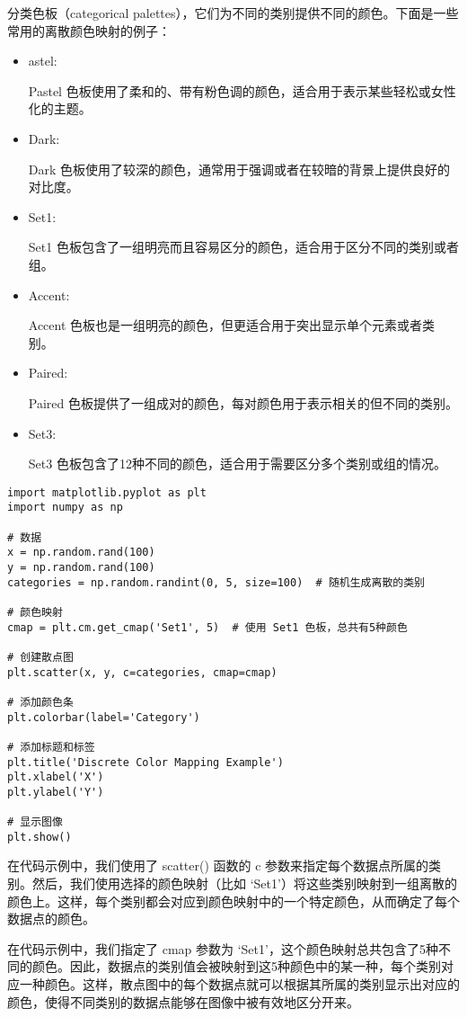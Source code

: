 \documentclass{article}
\begin{document}
分类色板（categorical palettes），它们为不同的类别提供不同的颜色。下面是一些常用的离散颜色映射的例子：
\begin{itemize}


    \item astel:

Pastel 色板使用了柔和的、带有粉色调的颜色，适合用于表示某些轻松或女性化的主题。
\item Dark:

Dark 色板使用了较深的颜色，通常用于强调或者在较暗的背景上提供良好的对比度。
\item  Set1:

Set1 色板包含了一组明亮而且容易区分的颜色，适合用于区分不同的类别或者组。
\item Accent:

Accent 色板也是一组明亮的颜色，但更适合用于突出显示单个元素或者类别。
\item Paired:

Paired 色板提供了一组成对的颜色，每对颜色用于表示相关的但不同的类别。
\item Set3:

Set3 色板包含了12种不同的颜色，适合用于需要区分多个类别或组的情况。
\end{itemize}
\begin{lstlisting}[caption={示例Python代码}]
import matplotlib.pyplot as plt
import numpy as np

# 数据
x = np.random.rand(100)
y = np.random.rand(100)
categories = np.random.randint(0, 5, size=100)  # 随机生成离散的类别

# 颜色映射
cmap = plt.cm.get_cmap('Set1', 5)  # 使用 Set1 色板，总共有5种颜色

# 创建散点图
plt.scatter(x, y, c=categories, cmap=cmap)

# 添加颜色条
plt.colorbar(label='Category')

# 添加标题和标签
plt.title('Discrete Color Mapping Example')
plt.xlabel('X')
plt.ylabel('Y')

# 显示图像
plt.show()
\end{lstlisting}
在代码示例中，我们使用了 scatter() 函数的 c 参数来指定每个数据点所属的类别。然后，我们使用选择的颜色映射（比如 ‘Set1’）将这些类别映射到一组离散的颜色上。这样，每个类别都会对应到颜色映射中的一个特定颜色，从而确定了每个数据点的颜色。

在代码示例中，我们指定了 cmap 参数为 ‘Set1’，这个颜色映射总共包含了5种不同的颜色。因此，数据点的类别值会被映射到这5种颜色中的某一种，每个类别对应一种颜色。这样，散点图中的每个数据点就可以根据其所属的类别显示出对应的颜色，使得不同类别的数据点能够在图像中被有效地区分开来。
\end{document}

